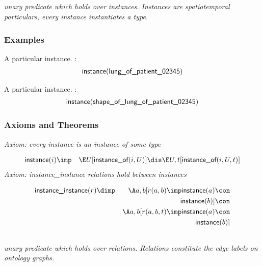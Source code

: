 \subsection{ }
\emph{unary predicate which holds over instances. Instances are spatiotemporal particulars, every instance instantiates a type.}

\subsubsection{Examples}
\begin{clist}
\item A particular instance. : \begin{eqnarray*}
 \mbox{\sf instance}( \mbox{\sf lung\_of\_patient\_02345}) 
\end{eqnarray*}

\item A particular instance. : \begin{eqnarray*}
 \mbox{\sf instance}( \mbox{\sf shape\_of\_lung\_of\_patient\_02345}) 
\end{eqnarray*}

\end{clist}

\subsubsection{Axioms and Theorems}


\emph{Axiom: every instance is an instance of some type}

\begin{eqnarray*}
 \pr{instance}(i) &\imp & \E U[ \pr{instance\_of}(i, U) ]\dis  \E U, t[ \pr{instance\_of}(i, U, t) ]
\end{eqnarray*}
\emph{Axiom: instance\_instance relations hold between instances}

\begin{eqnarray*}
 \pr{instance\_instance}(r) &\dimp & \A a, b[r(a, b) \imp  \pr{instance}(a) \con \\
&& \pr{instance}(b) ]\con \\
&& \A a, b[r(a, b, t) \imp  \pr{instance}(a) \con \\
&& \pr{instance}(b) ]
\end{eqnarray*}

\subsection{ }
\emph{unary predicate which holds over relations. Relations constitute the edge labels on ontology graphs.}

